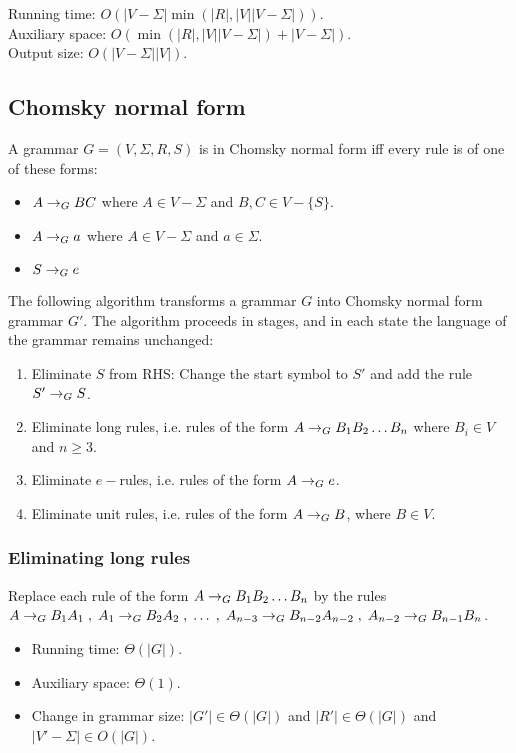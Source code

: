 Running time: $O(|V-\Sigma|\min(|R|, |V||V-\Sigma|))$.\\
Auxiliary space: $O(\min(|R|, |V||V-\Sigma|) + |V-\Sigma|)$.\\
Output size: $O(|V-\Sigma||V|)$.

\subsection{Chomsky normal form}

\begin{definition}
A grammar $G = (V, \Sigma, R, S)$ is in Chomsky normal form iff every rule is of one of these forms:
\begin{itemize}
\item $A \rightarrow_{G} BC$ where $A \in V - \Sigma$ and $B, C \in V - \{S\}$.
\item $A \rightarrow_{G} a$ where $A \in V - \Sigma$ and $a \in \Sigma$.
\item $S \rightarrow_{G} e$
\end{itemize}
\end{definition}

The following algorithm transforms a grammar $G$ into Chomsky normal form grammar $G'$.
The algorithm proceeds in stages, and in each state the language of the grammar remains unchanged:
\begin{enumerate}
\item Eliminate $S$ from RHS: Change the start symbol to $S'$ and add the rule $S' \rightarrow_{G} S$.
\item Eliminate long rules, i.e. rules of the form $A \rightarrow_{G} B_1B_2\ldots B_n$ where $B_i \in V$ and $n \ge 3$.
\item Eliminate $e-$rules, i.e. rules of the form $A \rightarrow_{G} e$.
\item Eliminate unit rules, i.e. rules of the form $A \rightarrow_{G} B$, where $B \in V$.
\end{enumerate}

\subsubsection{Eliminating long rules}

Replace each rule of the form $A \rightarrow_{G} B_1B_2\ldots B_n$ by the rules
$A \rightarrow_{G} B_1A_1 \;,\; A_1 \rightarrow_{G} B_2A_2 \;,\; \ldots \;,\;
A_{n-3} \rightarrow_{G} B_{n-2}A_{n-2} \;,\; A_{n-2} \rightarrow_{G} B_{n-1}B_n$.

\begin{itemize}
\item Running time: $\Theta(|G|)$.
\item Auxiliary space: $\Theta(1)$.
\item Change in grammar size: $|G'| \in \Theta(|G|)$ and $|R'| \in \Theta(|G|)$ and $|V'-\Sigma| \in O(|G|)$.
\end{itemize}

